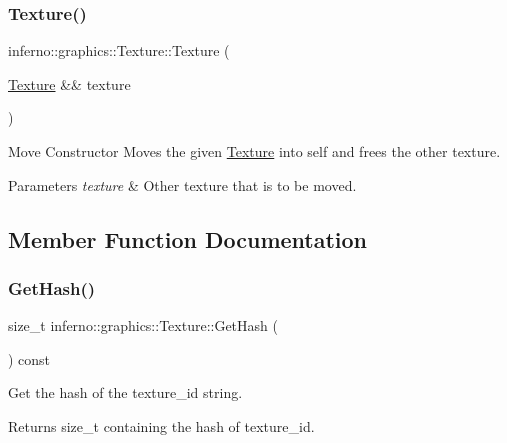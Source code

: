 \subsubsection{\texorpdfstring{Texture()}{Texture()}\hspace{0.1cm}{\footnotesize\ttfamily [2/2]}}
{\footnotesize\ttfamily inferno\+::graphics\+::\+Texture\+::\+Texture (\begin{DoxyParamCaption}\item[{\mbox{\hyperlink{classinferno_1_1graphics_1_1_texture}{Texture}} \&\&}]{texture }\end{DoxyParamCaption})\hspace{0.3cm}{\ttfamily [inline]}}



Move Constructor Moves the given \mbox{\hyperlink{classinferno_1_1graphics_1_1_texture}{Texture}} into self and frees the other texture. 


\begin{DoxyParams}{Parameters}
{\em texture} & Other texture that is to be moved. \\
\hline
\end{DoxyParams}


\subsection{Member Function Documentation}
\mbox{\label{classinferno_1_1graphics_1_1_texture_a4c1750e2d5574096d70bdb4cf3b91162}} 
\subsubsection{\texorpdfstring{Get\+Hash()}{GetHash()}}
{\footnotesize\ttfamily size\+\_\+t inferno\+::graphics\+::\+Texture\+::\+Get\+Hash (\begin{DoxyParamCaption}{ }\end{DoxyParamCaption}) const}



Get the hash of the texture\+\_\+id string. 

\begin{DoxyReturn}{Returns}
size\+\_\+t containing the hash of texture\+\_\+id. 
\end{DoxyReturn}
\mbox{\label{classinferno_1_1graphics_1_1_texture_a34c8a8546474066c66849ca2aceba0fd}} 

